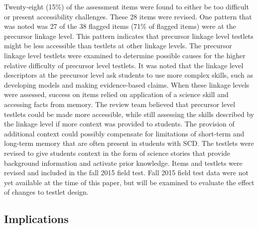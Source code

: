 \documentclass[11.5pt]{sig-alternate} %
\begin{document}
\begin{large}
Twenty-eight (15\%) of the assessment items were found to either be too difficult or present accessibility challenges. These 28 items were revised. One pattern that was noted was 27 of the 38 flagged items (71\% of flagged items) were at the precursor linkage level. This pattern indicates that precursor linkage level testlets might be less accessible than testlets at other linkage levels. The precursor linkage level testlets were examined to determine possible causes for the higher relative difficulty of precursor level testlets. It was noted that the linkage level descriptors at the precursor level ask students to use more complex skills, such as developing models and making evidence-based claims. When these linkage levels were assessed, success on items relied on application of a science skill and accessing facts from memory. The review team believed that precursor level testlets could be made more accessible, while still assessing the skills described by the linkage level if more context was provided to students. The provision of additional context could possibly compensate for limitations of short-term and long-term memory that are often present in students with SCD. The testlets were revised to give students context in the form of science stories that provide background information and activate prior knowledge. Items and testlets were revised and included in the fall 2015 field test. Fall 2015 field test data were not yet available at the time of this paper, but will be examined to evaluate the effect of changes to testlet design.

\subsection*{Implications}


\end{large}
\end{document}
